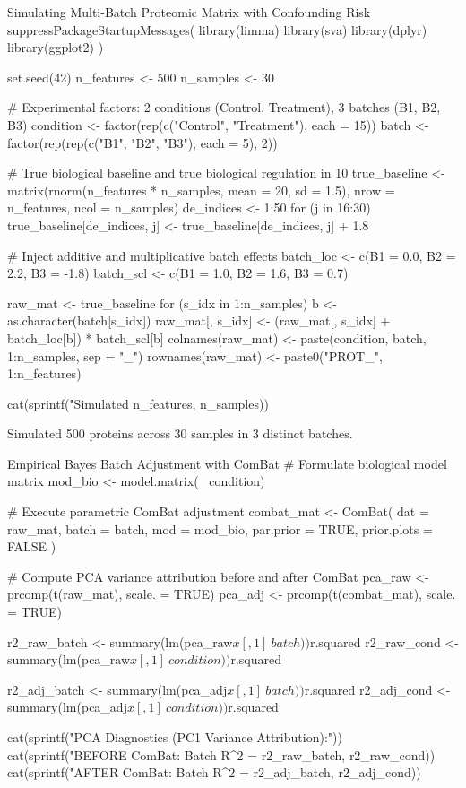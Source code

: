 \documentclass[11pt,oneside]{book}
\begin{document}
\begin{rchunk}{Simulating Multi-Batch Proteomic Matrix with Confounding Risk}
suppressPackageStartupMessages({
  library(limma)
  library(sva)
  library(dplyr)
  library(ggplot2)
})

set.seed(42)
n_features <- 500
n_samples  <- 30

# Experimental factors: 2 conditions (Control, Treatment), 3 batches (B1, B2, B3)
condition <- factor(rep(c("Control", "Treatment"), each = 15))
batch     <- factor(rep(rep(c("B1", "B2", "B3"), each = 5), 2))

# True biological baseline and true biological regulation in 10%
true_baseline <- matrix(rnorm(n_features * n_samples, mean = 20, sd = 1.5), 
                        nrow = n_features, ncol = n_samples)
de_indices <- 1:50
for (j in 16:30) {
  true_baseline[de_indices, j] <- true_baseline[de_indices, j] + 1.8
}

# Inject additive and multiplicative batch effects
batch_loc <- c(B1 = 0.0, B2 = 2.2, B3 = -1.8)
batch_scl <- c(B1 = 1.0, B2 = 1.6, B3 = 0.7)

raw_mat <- true_baseline
for (s_idx in 1:n_samples) {
  b <- as.character(batch[s_idx])
  raw_mat[, s_idx] <- (raw_mat[, s_idx] + batch_loc[b]) * batch_scl[b]
}
colnames(raw_mat) <- paste(condition, batch, 1:n_samples, sep = "_")
rownames(raw_mat) <- paste0("PROT_", 1:n_features)

cat(sprintf("Simulated %
            n_features, n_samples))
\end{rchunk}

\begin{routput}
Simulated 500 proteins across 30 samples in 3 distinct batches.
\end{routput}

\begin{rchunk}{Empirical Bayes Batch Adjustment with ComBat}
# Formulate biological model matrix
mod_bio <- model.matrix(~ condition)

# Execute parametric ComBat adjustment
combat_mat <- ComBat(
  dat = raw_mat,
  batch = batch,
  mod = mod_bio,
  par.prior = TRUE,
  prior.plots = FALSE
)

# Compute PCA variance attribution before and after ComBat
pca_raw <- prcomp(t(raw_mat), scale. = TRUE)
pca_adj <- prcomp(t(combat_mat), scale. = TRUE)

r2_raw_batch <- summary(lm(pca_raw$x[, 1] ~ batch))$r.squared
r2_raw_cond  <- summary(lm(pca_raw$x[, 1] ~ condition))$r.squared

r2_adj_batch <- summary(lm(pca_adj$x[, 1] ~ batch))$r.squared
r2_adj_cond  <- summary(lm(pca_adj$x[, 1] ~ condition))$r.squared

cat(sprintf("PCA Diagnostics (PC1 Variance Attribution):\n"))
cat(sprintf("BEFORE ComBat: Batch R^2 = %
            r2_raw_batch, r2_raw_cond))
cat(sprintf("AFTER  ComBat: Batch R^2 = %
            r2_adj_batch, r2_adj_cond))
\end{rchunk}
\end{document}
